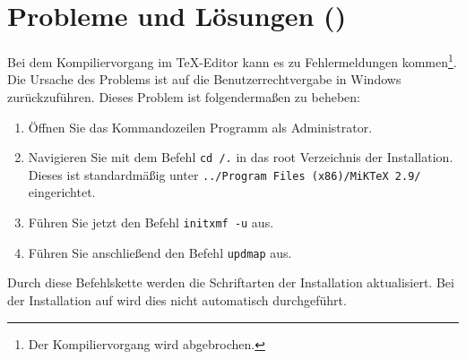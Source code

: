 \section{Probleme und Lösungen ()}\label{sec:probleme-und-loesungen}

Bei dem Kompiliervorgang im \TeX-Editor kann es zu Fehlermeldungen kommen\footnote{Der Kompiliervorgang wird abgebrochen.}.
Die Ursache des Problems ist auf die Benutzerrechtvergabe in Windows zurückzuführen.
Dieses Problem ist folgendermaßen zu beheben:

\begin{enumerate}
	\item Öffnen Sie das Kommandozeilen Programm als Administrator.
	\item Navigieren Sie mit dem Befehl \verb|cd /.| in das root Verzeichnis der  Installation. Dieses ist standardmäßig unter \verb|../Program Files (x86)/MiKTeX 2.9/| eingerichtet.
	\item Führen Sie jetzt den Befehl \verb|initxmf -u| aus.
	\item Führen Sie anschließend den Befehl \verb|updmap| aus.
\end{enumerate}

Durch diese Befehlskette werden die Schriftarten der  Installation aktualisiert. Bei der Installation auf  wird dies nicht automatisch durchgeführt.

